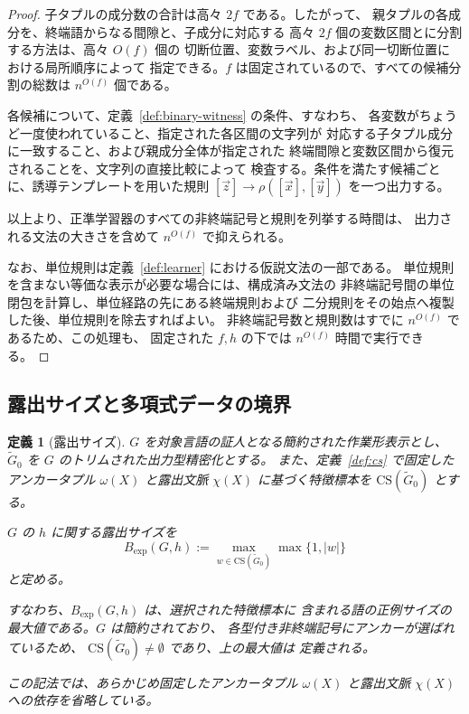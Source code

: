 \documentclass[11pt,a4paper]{ltjsarticle}
\newtheorem{definition}[theorem]{定義}
\theoremstyle{remark}
\newcommand{\CS}{\mathrm{CS}}
\newcommand{\tuple}[1]{\vec{#1}}
\begin{document}
\begin{proof}
子タプルの成分数の合計は高々 \(2f\) である。したがって、
親タプルの各成分を、終端語からなる間隙と、子成分に対応する
高々 \(2f\) 個の変数区間とに分割する方法は、高々 \(O(f)\) 個の
切断位置、変数ラベル、および同一切断位置における局所順序によって
指定できる。\(f\) は固定されているので、すべての候補分割の総数は
\(n^{O(f)}\) 個である。

各候補について、定義~\ref{def:binary-witness} の条件、すなわち、
各変数がちょうど一度使われていること、指定された各区間の文字列が
対応する子タプル成分に一致すること、および親成分全体が指定された
終端間隙と変数区間から復元されることを、文字列の直接比較によって
検査する。条件を満たす候補ごとに、誘導テンプレートを用いた規則
\([\tuple{z}]\to\rho([\tuple{x}],[\tuple{y}])\) を一つ出力する。

以上より、正準学習器のすべての非終端記号と規則を列挙する時間は、
出力される文法の大きさを含めて \(n^{O(f)}\) で抑えられる。

なお、単位規則は定義~\ref{def:learner} における仮説文法の一部である。
単位規則を含まない等価な表示が必要な場合には、構成済み文法の
非終端記号間の単位閉包を計算し、単位経路の先にある終端規則および
二分規則をその始点へ複製した後、単位規則を除去すればよい。
非終端記号数と規則数はすでに \(n^{O(f)}\) であるため、この処理も、
固定された \(f,h\) の下では \(n^{O(f)}\) 時間で実行できる。
\end{proof}

\subsection{露出サイズと多項式データの境界}
\label{subsec:exposure-boundary}

\begin{definition}[露出サイズ]
\label{def:exposure-size}
\(G\) を対象言語の証人となる簡約された作業形表示とし、
\(\widetilde{G}_0\) を \(G\) のトリムされた出力型精密化とする。
また、定義~\ref{def:cs} で固定したアンカータプル
\(\omega(X)\) と露出文脈 \(\chi(X)\) に基づく特徴標本を
\(\CS(\widetilde{G}_0)\) とする。

\(G\) の \(h\) に関する\emph{露出サイズ}を
\[
  B_{\mathrm{exp}}(G,h)
  :=
  \max_{w\in\CS(\widetilde{G}_0)}
  \max\{1,\lvert w\rvert\}
\]
と定める。

すなわち、\(B_{\mathrm{exp}}(G,h)\) は、選択された特徴標本に
含まれる語の正例サイズの最大値である。\(G\) は簡約されており、
各型付き非終端記号にアンカーが選ばれているため、
\(\CS(\widetilde{G}_0)\neq\emptyset\) であり、上の最大値は
定義される。

この記法では、あらかじめ固定したアンカータプル
\(\omega(X)\) と露出文脈 \(\chi(X)\) への依存を省略している。
\end{definition}
\end{document}
